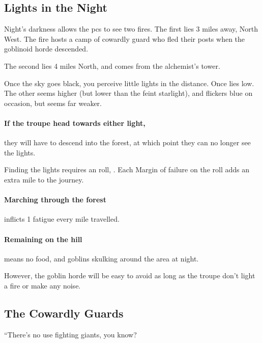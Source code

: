 \begin{multicols}{2}

\subsection{Lights in the Night}

Night's darkness allows the \glspl{pc} to see two fires.
The first lies 3 miles away, North West.
The fire hosts a camp of cowardly \gls{guard} who fled their posts when the goblinoid horde descended.

The second lies 4 miles North, and comes from the alchemist's tower.

\begin{boxtext}
  Once the sky goes black, you perceive little lights in the distance.
  Once lies low.
  The other seems higher (but lower than the feint starlight), and flickers blue on occasion, but seems far weaker.
\end{boxtext}

\paragraph{If the troupe head towards either light,}
they will have to descend into the forest, at which point they can no longer see the lights.

Finding the lights requires an  roll, \tn[9].
Each Margin of failure on the roll adds an extra mile to the journey.

\paragraph{Marching through the forest}
inflicts 1 \gls{fatigue} every mile travelled.%

\paragraph{Remaining on the hill}
means no food, and goblins skulking around the area at night.

However, the goblin horde will be easy to avoid as long as the troupe don't light a fire or make any noise.

\subsection{The Cowardly Guards}

\begin{speechtext}
  ``There's no use fighting giants, you know?


\end{speechtext}
\end{multicols}
